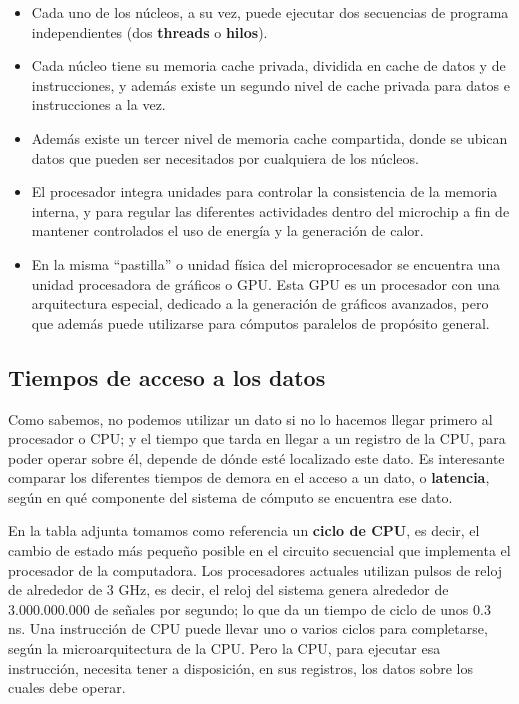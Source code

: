 \documentclass[spanish,A4,]{article}
\begin{document}
\begin{itemize}
\item
  Cada uno de los núcleos, a su vez, puede ejecutar dos secuencias de
  programa independientes (dos \textbf{threads} o \textbf{hilos}).
\item
  Cada núcleo tiene su memoria cache privada, dividida en cache de datos
  y de instrucciones, y además existe un segundo nivel de cache privada
  para datos e instrucciones a la vez.
\item
  Además existe un tercer nivel de memoria cache compartida, donde se
  ubican datos que pueden ser necesitados por cualquiera de los núcleos.
\item
  El procesador integra unidades para controlar la consistencia de la
  memoria interna, y para regular las diferentes actividades dentro del
  microchip a fin de mantener controlados el uso de energía y la
  generación de calor.
\item
  En la misma ``pastilla'' o unidad física del microprocesador se
  encuentra una unidad procesadora de gráficos o GPU. Esta GPU es un
  procesador con una arquitectura especial, dedicado a la generación de
  gráficos avanzados, pero que además puede utilizarse para cómputos
  paralelos de propósito general.
\end{itemize}

\subsection{Tiempos de acceso a los
datos}\label{tiempos-de-acceso-a-los-datos}

Como sabemos, no podemos utilizar un dato si no lo hacemos llegar
primero al procesador o CPU; y el tiempo que tarda en llegar a un
registro de la CPU, para poder operar sobre él, depende de dónde esté
localizado este dato. Es interesante comparar los diferentes tiempos de
demora en el acceso a un dato, o \textbf{latencia}, según en qué
componente del sistema de cómputo se encuentra ese dato.

En la tabla adjunta tomamos como referencia un \textbf{ciclo de CPU}, es
decir, el cambio de estado más pequeño posible en el circuito secuencial
que implementa el procesador de la computadora. Los procesadores
actuales utilizan pulsos de reloj de alrededor de 3 GHz, es decir, el
reloj del sistema genera alrededor de 3.000.000.000 de señales por
segundo; lo que da un tiempo de ciclo de unos 0.3 ns. Una instrucción de
CPU puede llevar uno o varios ciclos para completarse, según la
microarquitectura de la CPU. Pero la CPU, para ejecutar esa instrucción,
necesita tener a disposición, en sus registros, los datos sobre los
cuales debe operar.
\end{document}

